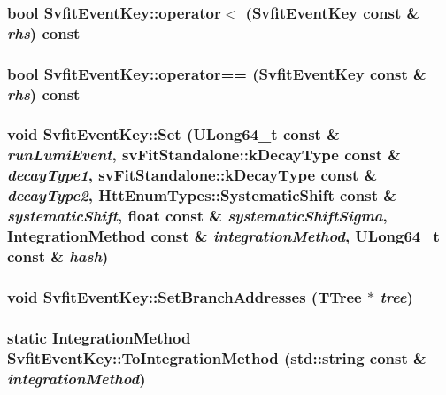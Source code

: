 \label{classSvfitEventKey_a16bde69686be01e07c60db6fe5fc2df0}
\hypertarget{classSvfitEventKey_aa21176141d7621a159c9e13443058385}{
\subsubsection[{operator$<$}]{\setlength{\rightskip}{0pt plus 5cm}bool SvfitEventKey::operator$<$ ({\bf SvfitEventKey} const \& {\em rhs}) const}}
\label{classSvfitEventKey_aa21176141d7621a159c9e13443058385}
\hypertarget{classSvfitEventKey_a4acd29df38157399bb5879ebf430e111}{
\subsubsection[{operator==}]{\setlength{\rightskip}{0pt plus 5cm}bool SvfitEventKey::operator== ({\bf SvfitEventKey} const \& {\em rhs}) const}}
\label{classSvfitEventKey_a4acd29df38157399bb5879ebf430e111}
\hypertarget{classSvfitEventKey_a69653824044f22206ef446001e2a8752}{
\subsubsection[{Set}]{\setlength{\rightskip}{0pt plus 5cm}void SvfitEventKey::Set (ULong64\_\-t const \& {\em runLumiEvent}, \/  svFitStandalone::kDecayType const \& {\em decayType1}, \/  svFitStandalone::kDecayType const \& {\em decayType2}, \/  {\bf HttEnumTypes::SystematicShift} const \& {\em systematicShift}, \/  float const \& {\em systematicShiftSigma}, \/  {\bf IntegrationMethod} const \& {\em integrationMethod}, \/  ULong64\_\-t const \& {\em hash})}}
\label{classSvfitEventKey_a69653824044f22206ef446001e2a8752}
\hypertarget{classSvfitEventKey_a14b4be71d2b92bdc1e2439bf088edfee}{
\subsubsection[{SetBranchAddresses}]{\setlength{\rightskip}{0pt plus 5cm}void SvfitEventKey::SetBranchAddresses (TTree $\ast$ {\em tree})}}
\label{classSvfitEventKey_a14b4be71d2b92bdc1e2439bf088edfee}
\hypertarget{classSvfitEventKey_ab29dafe105b8ade3257ee81cc31ad7ef}{
\subsubsection[{ToIntegrationMethod}]{\setlength{\rightskip}{0pt plus 5cm}static {\bf IntegrationMethod} SvfitEventKey::ToIntegrationMethod (std::string const \& {\em integrationMethod})}}
\label{classSvfitEventKey_ab29dafe105b8ade3257ee81cc31ad7ef}


